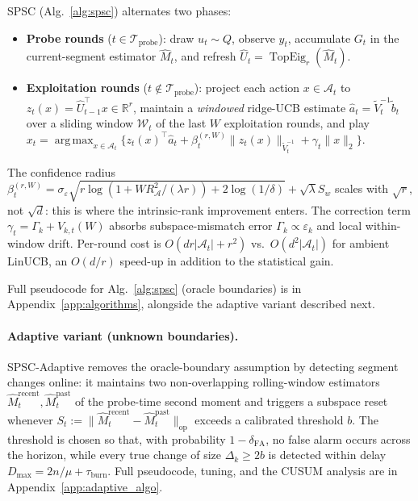\documentclass{article}
\newcommand{\R}{\mathbb{R}}
\newcommand{\op}{\mathrm{op}}
\newcommand{\cA}{\mathcal{A}}
\newcommand{\cW}{\mathcal{W}}
\newcommand{\cTprobe}{\mathcal{T}_{\mathrm{probe}}}
\DeclareMathOperator{\TopEig}{TopEig}
\DeclareMathOperator*{\argmax}{arg\,max}
\begin{document}
SPSC (Alg.~\ref{alg:spsc}) alternates two phases:
\begin{itemize}[leftmargin=1.5em,nosep]
\item \textbf{Probe rounds} ($t\in\cTprobe$): draw $u_t\sim Q$, observe
$y_t$, accumulate $G_t$ in the current-segment estimator $\widehat M_t$,
and refresh $\widehat U_t = \TopEig_r(\widehat M_t)$.
\item \textbf{Exploitation rounds} ($t\notin\cTprobe$): project each
action $x\in\cA_t$ to $z_t(x) = \widehat U_{t-1}^\top x\in\R^r$, maintain a
\emph{windowed} ridge-UCB estimate
$\widehat a_t = \widetilde V_t^{-1}\widetilde b_t$ over a sliding
window $\cW_t$ of the last $W$ exploitation rounds, and play
$x_t = \argmax_{x\in\cA_t}
\bigl\{ z_t(x)^\top\widehat a_t + \beta_t^{(r,W)}\|z_t(x)\|_{\widetilde V_t^{-1}}
+ \gamma_t \|x\|_2 \bigr\}$.
\end{itemize}
The confidence radius
$\beta_t^{(r,W)}=\sigma_\varepsilon\sqrt{r\log(1+WR_\cA^2/(\lambda r))
+2\log(1/\delta)}+\sqrt{\lambda}S_w$
scales with $\sqrt{r}$, not $\sqrt{d}$: this is where the intrinsic-rank
improvement enters. The correction term
$\gamma_t = \Gamma_k + V_{k,t}(W)$
absorbs subspace-mismatch error $\Gamma_k\propto\varepsilon_k$ and
local within-window drift. Per-round cost is $O(dr|\cA_t|+r^2)$ vs.\
$O(d^2|\cA_t|)$ for ambient LinUCB, an $O(d/r)$ speed-up in addition
to the statistical gain.

Full pseudocode for Alg.~\ref{alg:spsc} (oracle boundaries) is in
Appendix~\ref{app:algorithms}, alongside the adaptive variant
described next.

\paragraph{Adaptive variant (unknown boundaries).}
SPSC-Adaptive removes the oracle-boundary assumption by detecting
segment changes online: it maintains two non-overlapping rolling-window
estimators $\widehat M_t^{\mathrm{recent}}, \widehat M_t^{\mathrm{past}}$ of
the probe-time second moment and triggers a subspace reset whenever
$S_t := \|\widehat M_t^{\mathrm{recent}} - \widehat M_t^{\mathrm{past}}\|_\op$
exceeds a calibrated threshold $b$. The threshold is chosen so that,
with probability $1-\delta_{\mathrm{FA}}$, no false alarm occurs across
the horizon, while every true change of size $\Delta_k \ge 2b$ is
detected within delay $D_{\max} = 2n/\mu + \tau_{\mathrm{burn}}$. Full
pseudocode, tuning, and the CUSUM analysis are in
Appendix~\ref{app:adaptive_algo}.
\end{document}
